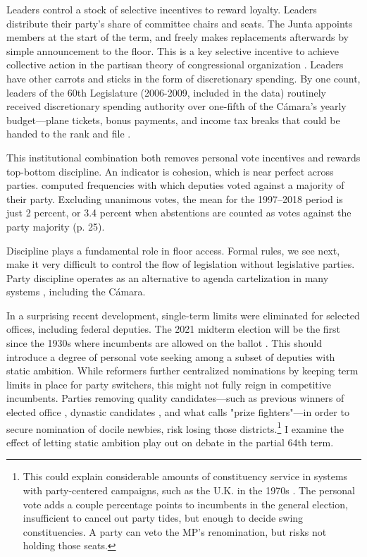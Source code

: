 \documentclass[letter,12pt]{article}
\begin{document}
Leaders control a stock of selective incentives to reward loyalty. Leaders distribute their party's share of committee chairs and seats. The Junta appoints members at the start of the term, and freely makes replacements afterwards by simple announcement to the floor. This is a key selective incentive to achieve collective action in the partisan theory of congressional organization \citep{cox.mccubbins.1993}. Leaders have other carrots and sticks in the form of discretionary spending. By one count, leaders of the 60th Legislature (2006-2009, included in the data) routinely received discretionary spending authority over one-fifth of the Cámara's yearly budget---plane tickets, bonus payments, and income tax breaks that could be handed to the rank and file \citep{casar.2011}.

This institutional combination both removes personal vote incentives \citep{carey.shugart.1995,cain.etal.1987} and rewards top-bottom discipline. An indicator is cohesion, which is near perfect across parties. \citet{tellez-del-rio.2018} computed frequencies with which deputies voted against a majority of their party. Excluding unanimous votes, the mean for the 1997--2018 period is just 2 percent, or 3.4 percent when abstentions are counted as votes against the party majority (p. 25). 

Discipline plays a fundamental role in floor access. Formal rules, we see next, make it very difficult to control the flow of legislation without legislative parties. Party discipline operates as an alternative to agenda cartelization in many systems \citep{prata.2006}, including the Cámara. 

In a surprising recent development, single-term limits were eliminated for selected offices, including federal deputies. The 2021 midterm election will be the first since the 1930s where incumbents are allowed on the ballot \citep[see][ for details]{magarInstReel.2017}. This should introduce a degree of personal vote seeking among a subset of deputies with static ambition. While reformers further centralized nominations by keeping term limits in place for party switchers, this might not fully reign in competitive incumbents. Parties removing quality candidates---such as previous winners of elected office \citep{jacobson.1997}, dynastic candidates \citep{enriquez-dinastias2018itam}, and what \citet{zallerprizeFighters} calls "prize fighters"---in order to secure nomination of docile newbies, risk losing those districts.\footnote{This could explain considerable amounts of constituency service in systems with party-centered campaigns, such as the U.K. in the 1970s \citep{cain.etal.1987}. The personal vote adds a couple percentage points to incumbents in the general election, insufficient to cancel out party tides, but enough to decide swing constituencies. A party can veto the MP's renomination, but risks not holding those seats.} I examine the effect of letting static ambition play out on debate in the partial 64th term. 
\end{document}
